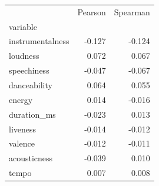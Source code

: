 \begin{tabular}{lrr}
\toprule
 & Pearson & Spearman \\
variable &  &  \\
\midrule
instrumentalness & -0.127 & -0.124 \\
loudness & 0.072 & 0.067 \\
speechiness & -0.047 & -0.067 \\
danceability & 0.064 & 0.055 \\
energy & 0.014 & -0.016 \\
duration\_ms & -0.023 & 0.013 \\
liveness & -0.014 & -0.012 \\
valence & -0.012 & -0.011 \\
acousticness & -0.039 & 0.010 \\
tempo & 0.007 & 0.008 \\
\bottomrule
\end{tabular}
